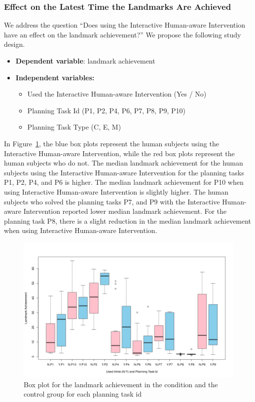 \subsubsection{Effect on the Latest Time the Landmarks Are Achieved}
We address the question ``Does using the Interactive Human-aware Intervention have an effect on the landmark achievement?''
We propose the following study design.
\begin{itemize}
\item \textbf{Dependent variable}: landmark achievement
\item \textbf{Independent variables:}
\begin{itemize}
\item Used the Interactive Human-aware Intervention (Yes / No)
\item Planning Task Id (P1, P2, P4, P6, P7, P8, P9, P10)
\item Planning Task Type (C, E, M)
\end{itemize}
\end{itemize}

In Figure~\ref{fig:achbypid}, the blue box plots represent the human subjects using the Interactive Human-aware Intervention, while the red box plots represent the human subjects who do not.
The median landmark achievement for the human subjects using the Interactive Human-aware Intervention for the planning tasks P1, P2, P4, and P6 is higher.
The median landmark achievement for P10 when using Interactive Human-aware Intervention is slightly higher.
The human subjects who solved the planning tasks P7, and P9 with the Interactive Human-aware Intervention reported lower median landmark achievement.
For the planning task P8, there is a slight reduction in the median landmark achievement when using Interactive Human-aware Intervention.
\begin{figure}[tpb]
  \centering
\includegraphics[width=0.9\columnwidth]{img/achbypid.png}
  \caption{Box plot for the landmark achievement in the condition and the control group for each planning task id}
  \label{fig:achbypid}
\end{figure}

